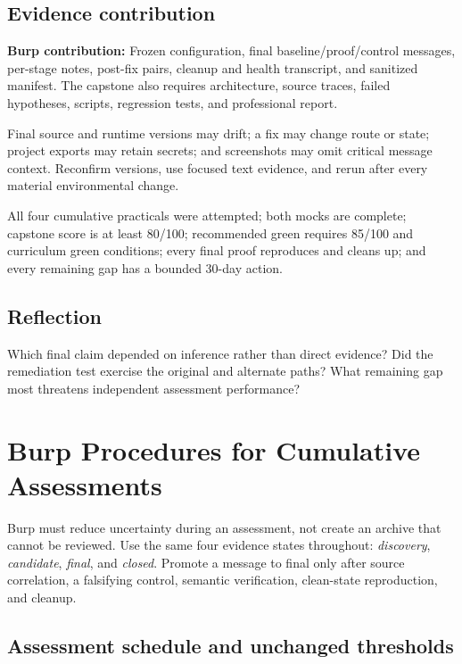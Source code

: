 \documentclass[11pt]{article}
\newcommand{\weekfield}[2]{%
  \Needspace{5\baselineskip}
  \subsection*{#1}
  #2
}
\newcommand{\burpevidence}[1]{\textbf{Burp contribution:} #1}
\begin{document}
\weekfield{Evidence contribution}{\burpevidence{Frozen configuration, final
baseline/proof/control messages, per-stage notes, post-fix pairs, cleanup and
health transcript, and sanitized manifest.} The capstone also requires architecture,
source traces, failed hypotheses, scripts, regression tests, and professional report.}

\begin{troubleshootingbox}
Final source and runtime versions may drift; a fix may change route or state;
project exports may retain secrets; and screenshots may omit critical message
context. Reconfirm versions, use focused text evidence, and rerun after every
material environmental change.
\end{troubleshootingbox}

\begin{checkpoints}
All four cumulative practicals were attempted; both mocks are complete; capstone
score is at least 80/100; recommended green requires 85/100 and curriculum green
conditions; every final proof reproduces and cleans up; and every remaining gap
has a bounded 30-day action.
\end{checkpoints}

\weekfield{Reflection}{Which final claim depended on inference rather than direct
evidence? Did the remediation test exercise the original and alternate paths?
What remaining gap most threatens independent assessment performance?}

\clearpage
\section{Burp Procedures for Cumulative Assessments}
\label{sec:assessments}

Burp must reduce uncertainty during an assessment, not create an archive that
cannot be reviewed. Use the same four evidence states throughout:
\emph{discovery}, \emph{candidate}, \emph{final}, and \emph{closed}. Promote a
message to final only after source correlation, a falsifying control, semantic
verification, clean-state reproduction, and cleanup.

\subsection{Assessment schedule and unchanged thresholds}
\end{document}
